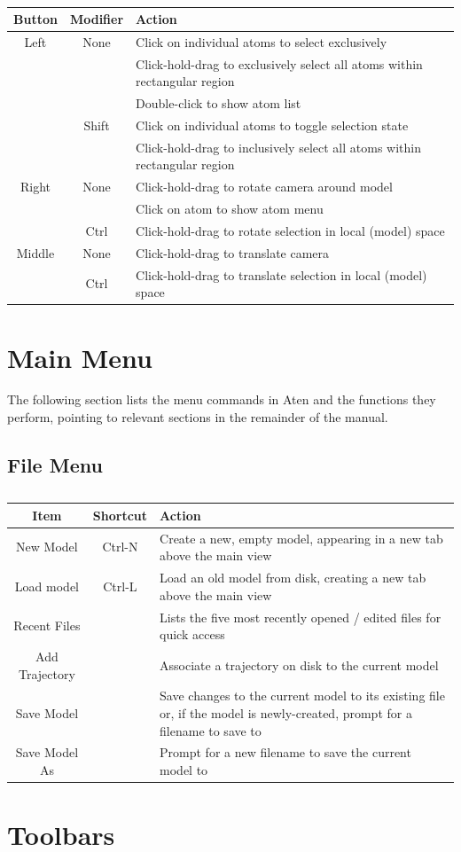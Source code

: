 \begin{table}[h!]
  \caption{}
  \begin{tabular}{cc|l}
\hline
	Button	& Modifier	& Action \\
\hline
	Left	& None		& Click on individual atoms to select exclusively \\
		&		& Click-hold-drag to exclusively select all atoms within rectangular region \\
		&		& Double-click to show atom list \\
		& Shift		& Click on individual atoms to toggle selection state \\
		&		& Click-hold-drag to inclusively select all atoms within rectangular region \\
\hline
	Right	& None		& Click-hold-drag to rotate camera around model \\
		&		& Click on atom to show atom menu \\
		& Ctrl		& Click-hold-drag to rotate selection in local (model) space \\
\hline
	Middle	& None		& Click-hold-drag to translate camera \\
		& Ctrl		& Click-hold-drag to translate selection in local (model) space \\
  \end{tabular}
\end{table}

\section{Main Menu}

The following section lists the menu commands in Aten and the functions they perform, pointing to relevant sections in the remainder of the manual.

\subsection{File Menu}

\begin{table}[h!]
	\caption{}
	\begin{tabular}{cc|l}
		Item		& Shortcut	& Action \\
		\hline
		New Model	& Ctrl-N & Create a new, empty model, appearing in a new tab above the main view \\
		Load model	& Ctrl-L & Load an old model from disk, creating a new tab above the main view \\
		Recent Files	&	 & Lists the five most recently opened / edited files for quick access \\
		Add Trajectory	& 	 & Associate a trajectory on disk to the current model \\
		Save Model	& 	 & Save changes to the current model to its existing file or, if the model is newly-created, prompt for a filename to save to \\
		Save Model As	&	 & Prompt for a new filename to save the current model to \\

	\end{tabular}
\end{table}


\section{Toolbars}
